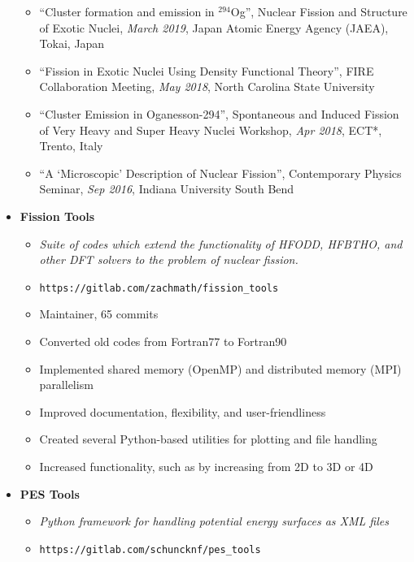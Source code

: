 \begin{itemize}
	\begin{itemize}
		\item ``Cluster formation and emission in $^{294}$Og'', Nuclear Fission and Structure of Exotic Nuclei, \textit{March 2019}, Japan Atomic Energy Agency (JAEA), Tokai, Japan
		\item ``Fission in Exotic Nuclei Using Density Functional Theory'', FIRE Collaboration Meeting, \textit{May 2018}, North Carolina State University
		\item ``Cluster Emission in Oganesson-294'', Spontaneous and Induced Fission of Very Heavy and Super Heavy Nuclei Workshop, \textit{Apr 2018}, ECT*, Trento, Italy
		\item ``A `Microscopic' Description of Nuclear Fission'', Contemporary Physics Seminar, \textit{Sep 2016}, Indiana University South Bend
	\end{itemize}
	\item \textbf{Fission Tools}
	\begin{itemize}
		\item \textit{Suite of codes which extend the functionality of HFODD, HFBTHO, and other DFT solvers to the problem of nuclear fission.}
		\item \verb|https://gitlab.com/zachmath/fission_tools|
		\item Maintainer, 65 commits
		\item Converted old codes from Fortran77 to Fortran90
		\item Implemented shared memory (OpenMP) and distributed memory (MPI) parallelism
		\item Improved documentation, flexibility, and user-friendliness
		\item Created several Python-based utilities for plotting and file handling
		\item Increased functionality, such as by increasing from 2D to 3D or 4D
	\end{itemize}
	\item \textbf{PES Tools}
	\begin{itemize}
		\item \textit{Python framework for handling potential energy surfaces as XML files}
		\item \verb|https://gitlab.com/schuncknf/pes_tools|

\end{itemize}
\end{itemize}
